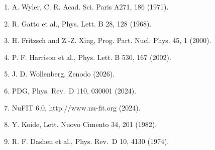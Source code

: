 \documentclass[
]{article}
\providecommand{\tightlist}{%
  \setlength{\itemsep}{0pt}\setlength{\parskip}{0pt}}
\begin{document}
\begin{enumerate}
\def\labelenumi{\arabic{enumi}.}
\tightlist
\item
  A. Wyler, C. R. Acad. Sci. Paris A271, 186 (1971).
\item
  R. Gatto et al., Phys. Lett. B 28, 128 (1968).
\item
  H. Fritzsch and Z.-Z. Xing, Prog. Part. Nucl. Phys. 45, 1 (2000).
\item
  P. F. Harrison et al., Phys. Lett. B 530, 167 (2002).
\item
  J. D. Wollenberg, Zenodo (2026).
\item
  PDG, Phys. Rev.~D 110, 030001 (2024).
\item
  NuFIT 6.0, http://www.nu-fit.org (2024).
\item
  Y. Koide, Lett. Nuovo Cimento 34, 201 (1982).
\item
  R. F. Dashen et al., Phys. Rev.~D 10, 4130 (1974).
\end{enumerate}
\end{document}
